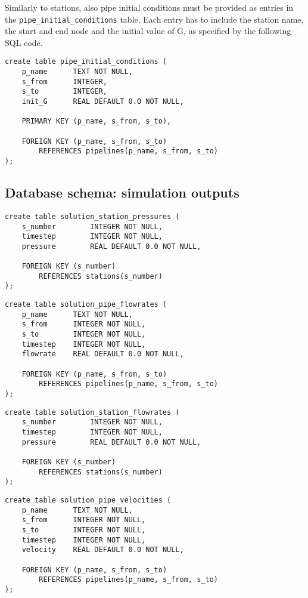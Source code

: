 Similarly to stations, also pipe initial conditions must be provided as entries
in the \texttt{pipe\_initial\_conditions} table. Each entry has to include the
station name, the start and end node and the initial value of G, as specified
by the following SQL code.
\begin{verbatim}
create table pipe_initial_conditions (
    p_name      TEXT NOT NULL,
    s_from      INTEGER,
    s_to        INTEGER,
    init_G      REAL DEFAULT 0.0 NOT NULL,
    
    PRIMARY KEY (p_name, s_from, s_to),

    FOREIGN KEY (p_name, s_from, s_to)
        REFERENCES pipelines(p_name, s_from, s_to)
);
\end{verbatim}
\subsection{Database schema: simulation outputs}

\begin{verbatim}
create table solution_station_pressures (
    s_number        INTEGER NOT NULL,
    timestep        INTEGER NOT NULL,
    pressure        REAL DEFAULT 0.0 NOT NULL,
    
    FOREIGN KEY (s_number)
        REFERENCES stations(s_number)
);
\end{verbatim}

\begin{verbatim}
create table solution_pipe_flowrates (
    p_name      TEXT NOT NULL,
    s_from      INTEGER NOT NULL,
    s_to        INTEGER NOT NULL,
    timestep    INTEGER NOT NULL,
    flowrate    REAL DEFAULT 0.0 NOT NULL,

    FOREIGN KEY (p_name, s_from, s_to)
        REFERENCES pipelines(p_name, s_from, s_to)
);
\end{verbatim}

\begin{verbatim}
create table solution_station_flowrates (
    s_number        INTEGER NOT NULL,
    timestep        INTEGER NOT NULL,
    pressure        REAL DEFAULT 0.0 NOT NULL,
    
    FOREIGN KEY (s_number)
        REFERENCES stations(s_number)
);
\end{verbatim}

\begin{verbatim}
create table solution_pipe_velocities (
    p_name      TEXT NOT NULL,
    s_from      INTEGER NOT NULL,
    s_to        INTEGER NOT NULL,
    timestep    INTEGER NOT NULL,
    velocity    REAL DEFAULT 0.0 NOT NULL,

    FOREIGN KEY (p_name, s_from, s_to)
        REFERENCES pipelines(p_name, s_from, s_to)
);
\end{verbatim}


